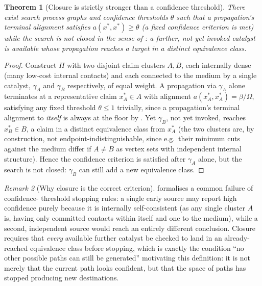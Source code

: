 \documentclass[11pt,twocolumn,a4paper]{article}
\theoremstyle{thmstyle}
\newtheorem{theorem}{Theorem}[section]
\theoremstyle{definition}
\theoremstyle{remark}
\newtheorem{remark}[theorem]{Remark}
\newcommand{\flo}{\beta}
\newcommand{\Proc}{\Pi}
\begin{document}
\begin{theorem}[Closure is strictly stronger than a confidence threshold]
\label{thm:closure-stronger}
There exist search process graphs and confidence thresholds $\theta$ such
that a propagation's terminal alignment satisfies $a(x^{\ast},x^{\ast})
\ge\theta$ (a fixed confidence criterion is met) while the search is not
closed in the sense of : a further, not-yet-invoked
catalyst is available whose propagation reaches a target in a distinct
equivalence class.
\end{theorem}

\begin{proof}
Construct $\Proc$ with two disjoint claim clusters $A,B$, each internally
dense (many low-cost internal contacts) and each connected to the medium
by a single catalyst, $\gamma_A$ and $\gamma_B$ respectively, of equal
weight. A propagation via $\gamma_A$ alone terminates at a representative
claim $x^{\ast}_A\in A$ with alignment $a(x^{\ast}_A,x^{\ast}_A)=\flo/\Omega$,
satisfying any fixed threshold $\theta\le1$ trivially, since a
propagation's terminal alignment to \emph{itself} is always at the floor
by . Yet $\gamma_B$, not yet invoked, reaches
$x^{\ast}_B\in B$, a claim in a distinct equivalence class from
$x^{\ast}_A$ (the two clusters are, by construction, not
endpoint-indistinguishable, since e.g.\ their minimum cuts against the
medium differ if $A\neq B$ as vertex sets with independent internal
structure). Hence the confidence criterion is satisfied after $\gamma_A$
alone, but the search is not closed: $\gamma_B$ can still add a new
equivalence class.
\end{proof}

\begin{remark}[Why closure is the correct criterion]
\label{rem:closure-correct}
 formalises a common failure of confidence-
threshold stopping rules: a single early source may report high confidence
purely because it is internally self-consistent (as any single cluster
$A$ is, having only committed contacts within itself and one to the
medium), while a second, independent source would reach an entirely
different conclusion. Closure requires that \emph{every} available further
catalyst be checked to land in an already-reached equivalence class before
stopping, which is exactly the condition ``no other possible paths can
still be generated'' motivating this definition: it is not merely that the
current path looks confident, but that the space of paths has stopped
producing new destinations.
\end{remark}
\end{document}
